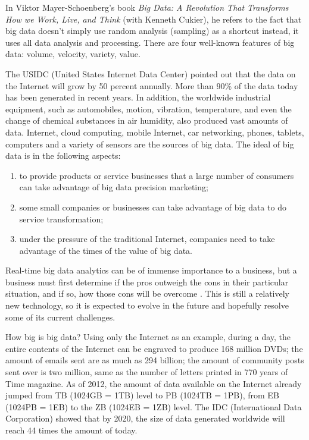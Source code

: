 In Viktor Mayer-Schoenberg's book \textit{Big Data: A Revolution That Transforms How we Work, Live, and Think} (with Kenneth Cukier), he refers to the fact that big data doesn't simply use random analysis (sampling) as a shortcut instead, it uses all data analysis and processing. There are four well-known features of big data: volume, velocity, variety, value.

The USIDC (United States Internet Data Center) pointed out that the data on the Internet will grow by 50 percent annually. More than 90\% of the data today has been generated in recent years. In addition, the worldwide industrial equipment, such as automobiles, motion, vibration, temperature, and even the change of chemical substances in air humidity, also produced vast amounts of data. Internet, cloud computing, mobile Internet, car networking, phones, tablets, computers and a variety of sensors are the sources of big data. The ideal of big data is in the following aspects:

\begin{enumerate}
  \item to provide products or service businesses that a large number of consumers can take advantage of big data precision marketing;
  \item some small companies or businesses can take advantage of big data to do service transformation;
  \item under the pressure of the traditional Internet, companies need to take advantage of the times of the value of big data.
\end{enumerate}

Real-time big data analytics can be of immense importance to a business, but a business must first determine if the pros outweigh the cons in their particular situation, and if so, how those cons will be overcome . This is still a relatively new technology, so it is expected to evolve in the future and hopefully resolve some of its current challenges.

How big is big data? Using only the Internet as an example, during a day, the entire contents of the Internet can be engraved to produce 168 million DVDs; the amount of emails sent are as much as 294 billion; the amount of community posts sent over is two million, same as the number of letters printed in 770 years of Time magazine. As of 2012, the amount of data available on the Internet already jumped from TB (1024GB = 1TB) level to PB (1024TB = 1PB), from EB (1024PB = 1EB) to the ZB (1024EB = 1ZB) level. The IDC (International Data Corporation) showed that by 2020, the size of data generated worldwide will reach 44 times the amount of today.

